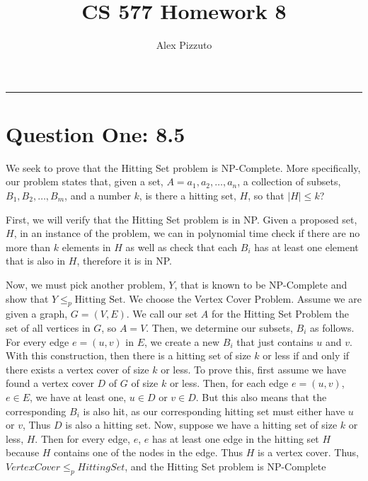 \documentclass[11pt,letterpaper]{article}
\author{Alex Pizzuto}
\title{CS 577 Homework 8}
\begin{document}
\date{}
\maketitle
\hrule

\section*{Question One: 8.5}
We seek to prove that the Hitting Set problem is NP-Complete. More specifically, our problem states that, given a set, $A = {a_1, a_2, \ldots, a_n}$, a collection of subsets, $B_1, B_2, \ldots, B_m$, and a number $k$, is there a hitting set, $H$, so that $|H| \leq k$?

First, we will verify that the Hitting Set problem is in NP. Given a proposed set, $H$, in an instance of the problem, we can in polynomial time check if there are no more than $k$ elements in $H$ as well as check that each $B_i$ has at least one element that is also in $H$, therefore it is in NP. 

Now, we must pick another problem, $Y$, that is known to be NP-Complete and show that $Y \leq _p \mbox{Hitting Set}$. We choose the Vertex Cover Problem. Assume we are given a graph, $G = (V, E)$. We call our set $A$ for the Hitting Set Problem the set of all vertices in $G$, so $A=V$. Then, we determine our subsets, $B_i$ as follows. For every edge $e = (u,v)$ in $E$, we create a new $B_i$ that just contains $u$ and $v$. With this construction, then there is  a hitting set of size $k$ or less if and only if there exists a vertex cover of size $k$ or less. To prove this, first assume we have found a vertex cover $D$ of $G$ of size $k$ or less. Then, for each edge $e=(u,v)$, $e \in E$, we have at least one, $u \in D$ or $v \in D$. But this also means that the corresponding $B_i$ is also hit, as our corresponding hitting set must either have $u$ or $v$, Thus $D$ is also a hitting set. Now, suppose we have a hitting set of size $k$ or less, $H$. Then for every edge, $e$, $e$ has at least one edge in the hitting set $H$ because $H$ contains one of the nodes in the edge. Thus $H$ is a vertex cover. Thus, $Vertex Cover \leq _p Hitting Set$, and the Hitting Set problem is NP-Complete
\end{document}

